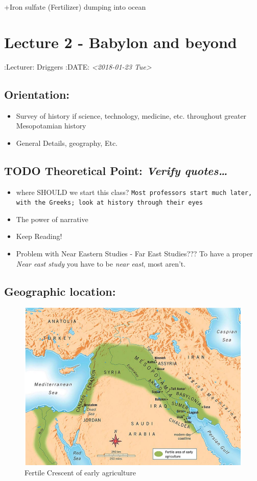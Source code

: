 \documentclass[11pt]{article}
\begin{document}
+Iron sulfate (Fertilizer) dumping into ocean


\section{Lecture 2 - Babylon and beyond}
\label{sec-3}
:Lecturer: Driggers
:DATE: \textit{<2018-01-23 Tue>}

\subsection{Orientation:}
\label{sec-3-1}
\begin{itemize}
\item Survey of history if science, technology, medicine, etc. throughout greater Mesopotamian history
\item General Details, geography, Etc.
\end{itemize}

\subsection{{\bfseries\sffamily TODO} Theoretical Point: \emph{Verify quotes\ldots{}}}
\label{sec-3-2}
\begin{itemize}
\item where SHOULD we start this class?
\texttt{Most professors start much later, with the Greeks; look at history through their eyes}

\item The power of narrative

\item Keep Reading!

\item Problem with Near Eastern Studies - Far East Studies???
To have a proper \emph{Near east study} you have to be \emph{near east}, most aren't.
\end{itemize}

\subsection{Geographic location:}
\label{sec-3-3}
\begin{figure}[htb]
\centering
\includegraphics[width=.9\linewidth]{./img/fertileCrescent.png}
\caption{Fertile Crescent of early agriculture}
\end{figure}
\end{document}
